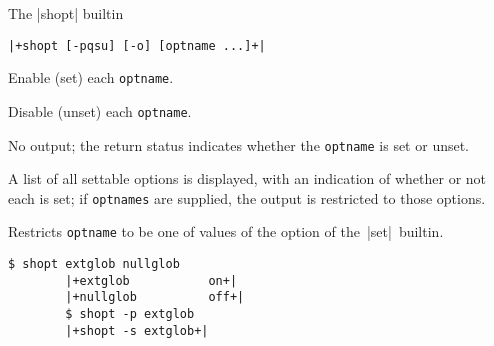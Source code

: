 \begin{frame}[fragile]{The \bash|shopt| builtin}{}
    \vspace{-2mm}
    \begin{lstlisting}[style=myBash, numbers=none]
        |+shopt [-pqsu] [-o] [optname ...]+|
    \end{lstlisting}
    \vspace{2mm}
    \begin{description}
        \item[\PB{\texttt{-s}}]
            Enable (set) each \texttt{optname}.
        \item[\PB{\texttt{-u}}]
            Disable (unset) each \texttt{optname}.
        \item[\PB{\texttt{-q}}]
            No output; the return status indicates whether the \texttt{optname} is set or unset.\\[-1mm]
        \item[\PB{\texttt{-p}}]
            A list of all settable options is displayed, with an indication of whether or not each is set; if \texttt{optnames} are supplied, the output is restricted to those options.\\[-1mm]
        \item[\PB{\texttt{-o}}]
            Restricts \texttt{optname} to be one of values of the  option of the \,\bash|set|\, builtin.
    \end{description}
    \begin{lstlisting}[style=myBash, aboveskip=2mm]
        $ shopt extglob nullglob
        |+extglob           on+|
        |+nullglob          off+|
        $ shopt -p extglob
        |+shopt -s extglob+|
    \end{lstlisting}
\end{frame}
